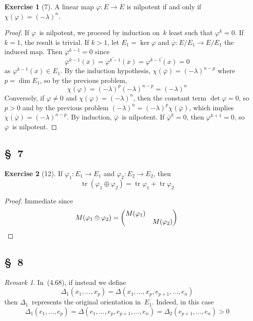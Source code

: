 \documentclass[letterpaper,12pt]{article}
\DeclareMathOperator{\tr}{tr}
\newcommand{\dsum}{\oplus}
\theoremstyle{definition}
\newtheorem*{exer}{Exercise}
\theoremstyle{remark}
\newtheorem*{rmk}{Remark}
\begin{document}
\begin{exer}[7]
A linear map \(\varphi:E\to E\) is nilpotent if and only if \(\chi(\varphi)=(-\lambda)^n\).
\end{exer}
\begin{proof}
If \(\varphi\)~is nilpotent, we proceed by induction on~\(k\) least such that \(\varphi^k=0\). If \(k=1\), the result is trivial. If \(k>1\), let \(E_1=\ker\varphi\) and \(\overline{\varphi}:E/E_1\to E/E_1\) the induced map. Then \(\overline{\varphi}^{k-1}=0\) since
\[\overline{\varphi}^{k-1}(\overline{x})=\overline{\varphi^{k-1}}(\overline{x})=\overline{\varphi^{k-1}(x)}=0\]
as \(\varphi^{k-1}(x)\in E_1\). By the induction hypothesis, \(\chi(\overline{\varphi})=(-\lambda)^{n-p}\) where \(p=\dim E_1\), so by the previous problem,
\[\chi(\varphi)=(-\lambda)^p(-\lambda)^{n-p}=(-\lambda)^n\]
Conversely, if \(\varphi\ne0\) and \(\chi(\varphi)=(-\lambda)^n\), then the constant term \(\det\varphi=0\), so \(p>0\) and by the previous problem \((-\lambda)^n=(-\lambda)^p\chi(\overline{\varphi})\), which implies \(\chi(\overline{\varphi})=(-\lambda)^{n-p}\). By induction, \(\overline{\varphi}\)~is nilpotent. If \(\overline{\varphi}^k=0\), then \(\varphi^{k+1}=0\), so \(\varphi\)~is nilpotent.
\end{proof}

\subsection*{\S~7}
\begin{exer}[12]
If \(\varphi_1:E_1\to E_1\) and \(\varphi_2:E_2\to E_2\), then
\[\tr(\varphi_1\dsum\varphi_2)=\tr\varphi_1+\tr\varphi_2\]
\end{exer}
\begin{proof}
Immediate since
\[M(\varphi_1\dsum\varphi_2)=\begin{pmatrix}
M(\varphi_1)&\\
&M(\varphi_2)
\end{pmatrix}\qedhere\]
\end{proof}

\subsection*{\S~8}
\begin{rmk}
In~(4.68), if instead we define
\[\Delta_1(x_1,\ldots,x_p)=\Delta(x_1,\ldots,x_p,e_{p+1},\ldots,e_n)\]
then \(\Delta_1\)~represents the original orientation in~\(E_1\). Indeed, in this case
\[\Delta_1(e_1,\ldots,e_p)=\Delta(e_1,\ldots,e_p,e_{p+1},\ldots,e_n)=\Delta_2(e_{p+1},\ldots,e_n)>0\]
\end{rmk}
\end{document}
